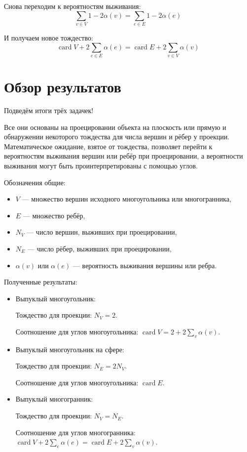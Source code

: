 \documentclass[12pt]{article} %
\theoremstyle{definition} %
\DeclareMathOperator{\card}{card}
\begin{document}
Снова переходим к вероятностям выживания:
\[
\sum_{v\in V} 1 - 2\alpha(v) = \sum_{e\in E} 1 - 2\alpha(e)
\]

И получаем новое тождество:
\[
\card V + 2\sum_{e\in E} \alpha(e) = \card E + 2\sum_{v\in V} \alpha(v)
\]


\section{Обзор результатов}

Подведём итоги трёх задачек! 

Все они основаны на проецировании объекта на плоскость или прямую и обнаружении некоторого тождества для числа вершин и рёбер у проекции.
Математическое ожидание, взятое от тождества, позволяет перейти к вероятностям выживания вершин или ребёр при проецировании,
а вероятности выживания могут быть проинтерпретированы с помощью углов.


Обозначения общие: 

\begin{itemize}
  \item $V$ — множество вершин исходного многоугольника или многогранника, 
  \item $E$ — множество ребёр, 
  \item $N_V$ — число вершин, выживших при проецировании,
  \item $N_E$ — число рёбер, выживших при проецировании,
  \item $\alpha(v)$ или $\alpha(e)$ — вероятность выживания вершины или ребра.
\end{itemize}


Полученные результаты:

\begin{itemize}
\item  Выпуклый многоугольник:

Тождество для проекции: $N_V = 2$.

Соотношение для углов многоугольника: $\card V = 2 + 2\sum_v \alpha(v)$.

\item Выпуклый многоугольник на сфере:

Тождество для проекции: $N_E = 2 N_V$.

Соотношение для углов многоугольника: $\card E $.

\item Выпуклый многогранник:

Тождество для проекции: $N_V = N_E$.

Соотношение для углов многогранника: $\card V + 2\sum_e \alpha(e) = \card E + 2\sum_v \alpha(v)$.
\end{itemize}
\end{document}
